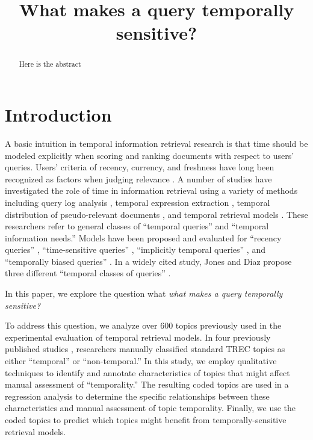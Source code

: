 \documentclass{sig-alternate}
\begin{document}
%

\title{What makes a query temporally sensitive?}

\maketitle
\begin{abstract}
Here is the abstract
\end{abstract}


\terms{}

\keywords{}

\section{Introduction}

A basic intuition in temporal information retrieval research is that time should be modeled explicitly when scoring and ranking documents with respect to users' queries. Users' criteria of recency, currency, and freshness have long been recognized as factors when judging relevance \cite{Barry1998}.  A number of studies have investigated the role of time in information retrieval using a variety of methods including query log analysis \cite{Kulkarni2011,Shokouhi2011,Metzler2009}, temporal expression extraction \cite{Berberich2010, Kanhabua2011}, temporal distribution of pseudo-relevant documents \cite{Jones2007}, and temporal retrieval models \cite{Li2003, Efron2011, Dakka2012}.  These researchers refer to general classes of ``temporal queries'' and ``temporal information needs.''  Models have been proposed and evaluated for ``recency queries'' \cite{Li2003, Efron2011}, ``time-sensitive queries'' \cite{Dakka2012}, ``implicitly temporal queries'' \cite{Metzler2009}, and ``temporally biased queries'' \cite{Jones2007}.  In a widely cited study, Jones and Diaz propose three different ``temporal classes of queries'' \cite{Jones2007}.  

In this paper, we explore the question what \emph{what makes a query temporally sensitive?} 

To address this question, we analyze over 600 topics previously used in the experimental evaluation of temporal retrieval models. In four previously published studies \cite{Jones2007, Efron2011, Dakka2012, Peetz2013}, researchers manually classified standard TREC topics as either ``temporal'' or ``non-temporal.'' In this study, we employ qualitative techniques to identify and annotate characteristics of topics that might affect manual assessment of ``temporality.'' The resulting coded topics are used in a regression analysis to determine the specific relationships between these characteristics and manual assessment of topic temporality. Finally, we use the coded topics to predict which topics might benefit from temporally-sensitive retrieval models.
\end{document}
